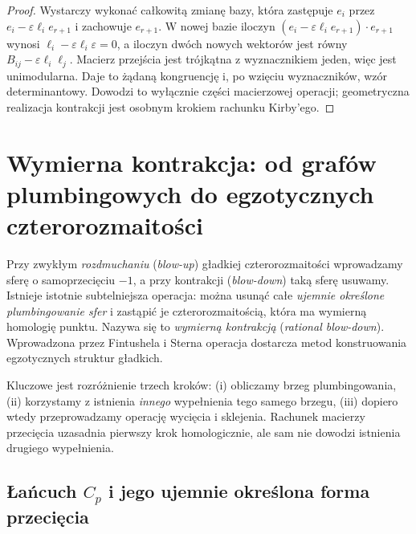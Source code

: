 \documentclass[11pt,a4paper]{report}
\numberwithin{equation}{section}
\theoremstyle{plain}
\theoremstyle{definition}
\theoremstyle{remark}
\begin{document}
\begin{proof}
Wystarczy wykonać całkowitą zmianę bazy, która zastępuje
$e_i$ przez $e_i-\varepsilon\ell_i e_{r+1}$ i zachowuje
$e_{r+1}$. W nowej bazie iloczyn
$(e_i-\varepsilon\ell_i e_{r+1})\cdot e_{r+1}$
wynosi $\ell_i-\varepsilon\ell_i\varepsilon=0$,
a iloczyn dwóch nowych wektorów jest równy
$B_{ij}-\varepsilon\ell_i\ell_j$.
Macierz przejścia jest trójkątna z wyznacznikiem jeden,
więc jest unimodularna. Daje to żądaną kongruencję
i, po wzięciu wyznaczników, wzór determinantowy.
Dowodzi to wyłącznie części macierzowej operacji;
geometryczna realizacja kontrakcji jest osobnym krokiem
rachunku Kirby'ego.
\end{proof}

\chapter{Wymierna kontrakcja: od grafów plumbingowych do egzotycznych czterorozmaitości}
\label{ch:tg-rational-blowdown}

Przy zwykłym \emph{rozdmuchaniu} (\emph{blow-up}) gładkiej
czterorozmaitości wprowadzamy sferę o samoprzecięciu $-1$,
a przy kontrakcji (\emph{blow-down}) taką sferę usuwamy.
Istnieje istotnie subtelniejsza operacja: można usunąć całe
\emph{ujemnie określone plumbingowanie sfer} i zastąpić je
czterorozmaitością, która ma wymierną homologię punktu.
Nazywa się to \emph{wymierną kontrakcją} (\emph{rational
blow-down}). Wprowadzona przez Fintushela i Sterna operacja
dostarcza metod konstruowania egzotycznych struktur gładkich.

Kluczowe jest rozróżnienie trzech kroków: (i) obliczamy brzeg
plumbingowania, (ii) korzystamy z istnienia \emph{innego}
wypełnienia tego samego brzegu, (iii) dopiero wtedy
przeprowadzamy operację wycięcia i sklejenia. Rachunek
macierzy przecięcia uzasadnia pierwszy krok homologicznie,
ale sam nie dowodzi istnienia drugiego wypełnienia.

\section{Łańcuch \texorpdfstring{$C_p$}{Cp} i jego ujemnie określona forma przecięcia}
\label{sec:tg-rb-config}
\end{document}
